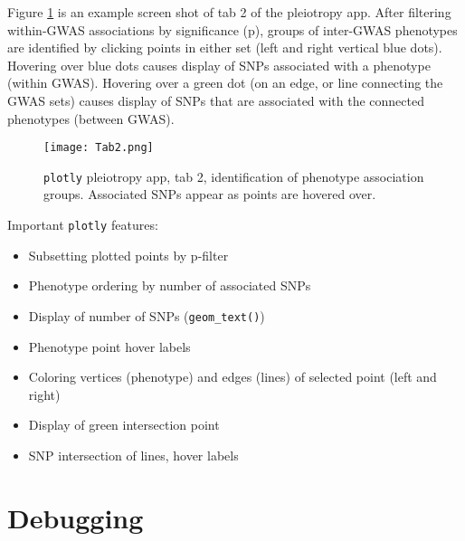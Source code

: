 \documentclass[10pt, letterpaper]{article}
\begin{document}
\begin{spacing}{1.0}
\clearpage

Figure \ref{fg:tab2} is an example screen shot of tab 2 of the pleiotropy app.  After filtering within-GWAS associations by significance (p), groups of inter-GWAS phenotypes are identified by clicking points in either set (left and right vertical blue dots).  Hovering over blue dots causes display of SNPs associated with a phenotype (within GWAS).  Hovering over a green dot (on an edge, or line connecting the GWAS sets) causes display of SNPs that are associated with the connected phenotypes (between GWAS). 

\begin{figure}[H]
    \texttt{[image: Tab2.png]}
    \centering
    \caption{\texttt{plotly} pleiotropy app, tab 2, identification of phenotype association groups.  Associated SNPs appear as points are hovered over.}
    \label{fg:tab2}
\end{figure}

Important \texttt{plotly} features:

\begin{itemize}
    \item Subsetting plotted points by p-filter
    \item Phenotype ordering by number of associated SNPs
    \item Display of number of SNPs (\texttt{geom\_text()})
    \item Phenotype point hover labels
    \item Coloring vertices (phenotype) and edges (lines) of selected point (left and right)
    \item Display of green intersection point
    \item SNP intersection of lines, hover labels 
\end{itemize}


\clearpage

\section{Debugging}\label{sec:debugging}


\end{spacing}
\end{document}
